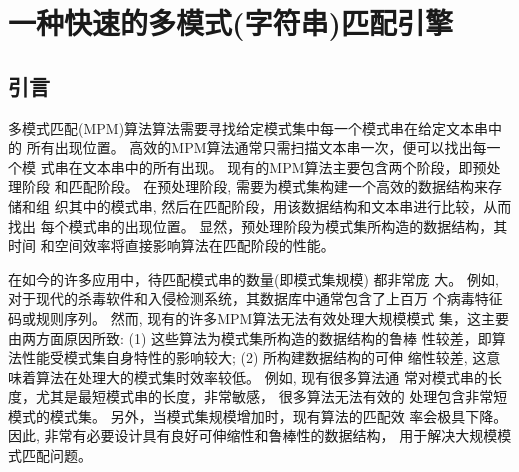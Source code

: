 





\chapter{一种快速的多模式(字符串)匹配引擎}
\label{chap:MPM}

\section{引言}
\label{sec:2_introduction}


多模式匹配(MPM)算法算法需要寻找给定模式集中每一个模式串在给定文本串中的
所有出现位置。 高效的MPM算法通常只需扫描文本串一次，便可以找出每一个模
式串在文本串中的所有出现。 现有的MPM算法主要包含两个阶段，即预处理阶段
和匹配阶段。 在预处理阶段, 需要为模式集构建一个高效的数据结构来存储和组
织其中的模式串, 然后在匹配阶段，用该数据结构和文本串进行比较，从而找出
每个模式串的出现位置。 显然，预处理阶段为模式集所构造的数据结构，其时间
和空间效率将直接影响算法在匹配阶段的性能。

在如今的许多应用中，待匹配模式串的数量(即模式集规模) 都非常庞
大。 例如, 对于现代的杀毒软件和入侵检测系统，其数据库中通常包含了上百万
个病毒特征码或规则序列。 然而, 现有的许多MPM算法无法有效处理大规模模式
集，这主要由两方面原因所致: (1) 这些算法为模式集所构造的数据结构的鲁棒
性较差，即算法性能受模式集自身特性的影响较大; (2) 所构建数据结构的可伸
缩性较差, 这意味着算法在处理大的模式集时效率较低。 例如, 现有很多算法通
常对模式串的长度，尤其是最短模式串的长度，非常敏感， 很多算法无法有效的
处理包含非常短模式的模式集。 另外，当模式集规模增加时，现有算法的匹配效
率会极具下降。因此, 非常有必要设计具有良好可伸缩性和鲁棒性的数据结构，
用于解决大规模模式匹配问题。


